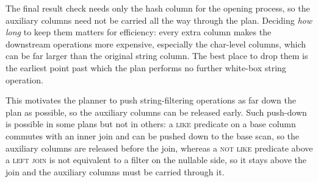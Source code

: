 \begin{remark}
The final result check needs only the hash column for the opening process, so the auxiliary columns need not be carried all the way through the plan. Deciding \emph{how long} to keep them matters for efficiency: every extra column makes the downstream operations more expensive, especially the char-level columns, which can be far larger than the original string column. The best place to drop them is the earliest point past which the plan performs no further white-box string operation.

This motivates the planner to push string-filtering operations as far down the plan as possible, so the auxiliary columns can be released early. Such push-down is possible in some plans but not in others: a \textsc{like} predicate on a base column commutes with an inner join and can be pushed down to the base scan, so the auxiliary columns are released before the join, whereas a \textsc{not like} predicate above a \textsc{left join} is not equivalent to a filter on the nullable side, so it stays above the join and the auxiliary columns must be carried through it.
\end{remark}

